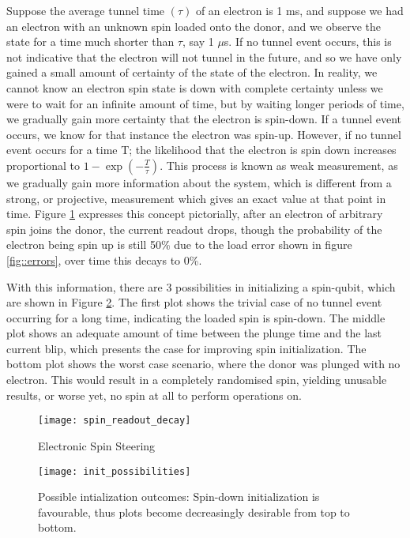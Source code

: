 		Suppose the average tunnel time $(\tau)$ of an electron is 1 ms, and suppose we had an electron with an unknown spin loaded onto the donor, and we observe the state for a time much shorter than $\tau$, say 1 $\mu$s. If no tunnel event occurs, this is not indicative that the electron will not tunnel in the future, and so we have only gained a small amount of certainty of the state of the electron. In reality, we cannot know an electron spin state is down with complete certainty unless we were to wait for an infinite amount of time, but by waiting longer periods of time, we gradually gain more certainty that the electron is spin-down. If a tunnel event occurs, we know for that instance the electron was spin-up. However, if no tunnel event occurs for a time T; the likelihood that the electron is spin down increases proportional to $1-\exp\left(-\frac{T}{\tau}\right)$.  This process is known as weak measurement, as we gradually gain more information about the system, which is different from a strong, or projective, measurement which gives an exact value at that point in time. Figure \ref{fig::spin_readout_decay} expresses this concept pictorially, after an electron of arbitrary spin joins the donor, the current readout drops, though the probability of the electron being spin up is still 50\% due to the load error shown in figure \ref{fig::errors}, over time this decays to 0\%. 
		
		With this information, there are 3 possibilities in initializing a spin-qubit, which are shown in Figure \ref{fig::init_possibilities}. The first plot shows the trivial case of no tunnel event occurring for a long time, indicating the loaded spin is spin-down. The middle plot shows an adequate amount of time between the plunge time and the last current blip, which presents the case for improving spin initialization. The bottom plot shows the worst case scenario, where the donor was plunged with no electron. This would result in a completely randomised spin, yielding unusable results, or worse yet, no spin at all to perform operations on. 
		
		\begin{figure}[htbp!]
			\centering
			\texttt{[image: spin\_readout\_decay]}
			\caption{Electronic Spin Steering}
			\label{fig::spin_readout_decay}
		\end{figure}
		
		\begin{figure}[htbp!]
			\centering
			\texttt{[image: init\_possibilities]}
			\caption[Possible initialisation outcomes]{Possible intialization outcomes: Spin-down initialization is favourable, thus plots become decreasingly desirable from top to bottom.}
			\label{fig::init_possibilities}
		\end{figure}
		
